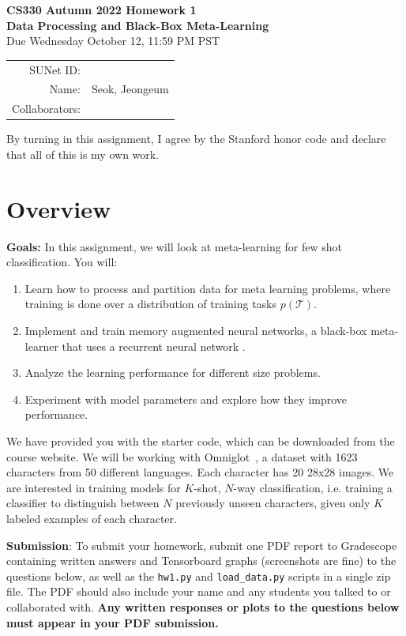 \documentclass[12pt]{article}
\begin{document}
    \begin{center}
    {\Large \textbf{CS330 Autumn 2022 Homework 1 \\ Data Processing and Black-Box Meta-Learning}}
        \\ {\large Due Wednesday October 12, 11:59 PM PST}

        \begin{tabular}{rl}
            SUNet ID:      &                \\
            Name:          & Seok, Jeongeum \\
            Collaborators: &
        \end{tabular}
    \end{center}

    By turning in this assignment, I agree by the Stanford honor code and declare
    that all of this is my own work.

    \section*{Overview}

    \textbf{Goals:} In this assignment, we will look at meta-learning for few shot classification. You will:
    \begin{enumerate}
        \item Learn how to process and partition data for meta learning problems, where training is done over a distribution of training tasks $p(\mathcal{T})$.
        \item Implement and train memory augmented neural networks, a black-box meta-learner that uses a recurrent neural network \cite{pmlr-v48-santoro16}.
        \item Analyze the learning performance for different size problems.
        \item Experiment with model parameters and explore how they improve performance.
    \end{enumerate}

    We have provided you with the starter code, which can be downloaded from the course website. We will be working with Omniglot~\cite{Lake1332}, a dataset with 1623 characters from 50 different languages. Each character has 20 28x28 images.
    We are interested in training models for $K$-shot, $N$-way classification, i.e. training a classifier to distinguish between $N$ previously unseen characters, given only $K$ labeled examples of each character.

    \vspace{0.2cm}
    \noindent\textbf{Submission}: To submit your homework, submit one PDF report to Gradescope containing written answers and Tensorboard graphs (screenshots are fine) to the questions below, as well as the \texttt{hw1.py} and \texttt{load\_data.py} scripts in a single zip file. The PDF should also include your name and any students you talked to or collaborated with. \textbf{Any written responses or plots to the questions below must appear in your PDF submission.}
\end{document}
